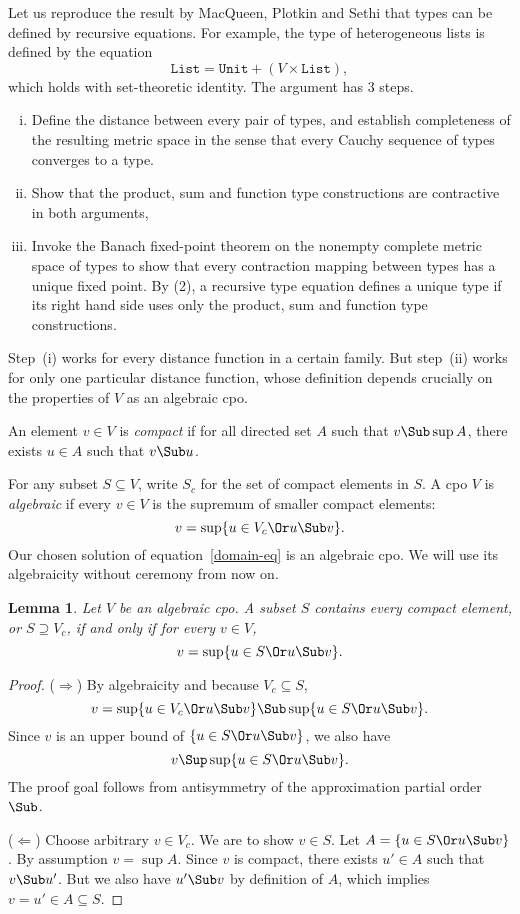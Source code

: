\documentclass{amsart}
\newtheorem{lemma}[subsection]{Lemma}
\begin{document}

Let us reproduce the result by MacQueen, Plotkin and Sethi that
types can be defined by recursive equations. For example, the
type of heterogeneous lists is defined by the equation
\[
\texttt{List} = \texttt{Unit} + (V \times \texttt{List}),
\]
which holds with set-theoretic identity. The argument has 3
steps.
\begin{enumerate}[(i)]
\item Define the distance between every pair of types, and
establish completeness of the resulting metric space in the sense
that every Cauchy sequence of types converges to a type.
\item Show that the product, sum and function type constructions
are contractive in both arguments,
\item Invoke the Banach fixed-point theorem on the nonempty
complete metric space of types to show that every contraction
mapping between types has a unique fixed point. By (2), a
recursive type equation defines a unique type if its right hand
side uses only the product, sum and function type constructions.
\end{enumerate}

Step~(i) works for every distance function in a certain family.
But step~(ii) works for only one particular distance function,
whose definition depends crucially on the properties of $V$ as an
algebraic cpo.


An element $v\in V$ is \emph{compact} if for all directed set $A$
such that $v\Sub\sup A$, there exists $u\in A$ such that $v\Sub
u$.

For any subset $S\subseteq V$, write $S_c$ for the set of compact
elements in $S$. A cpo $V$ is \emph{algebraic} if every $v\in V$
is the supremum of smaller compact elements:
\[
v=\sup \{u \in V_c \Or u \Sub v \}.
\]
Our chosen solution of equation~\eqref{domain-eq} is an algebraic
cpo. We will use its algebraicity without ceremony from now on.

\begin{lemma}
Let $V$ be an algebraic cpo. A subset $S$ contains every compact
element, or $S\supseteq V_c$, if and only if for every $v\in V$,
\[
v=\sup\{u\in S \Or u\Sub v\}.
\]
\end{lemma}

\begin{proof}
($\Rightarrow$) By algebraicity and because $V_c\subseteq S$,
\[
v=\sup\{u\in V_c \Or u \Sub v\} \Sub \sup\{u\in S \Or u \Sub v\}.
\]
Since $v$ is an upper bound of $\{u\in S \Or u \Sub v\}$, we also
have
\[
v\Sup \sup\{u\in S \Or u \Sub v\}.
\]
The proof goal follows from antisymmetry of the approximation
partial order $\Sub$.

($\Leftarrow$) Choose arbitrary $v\in V_c$. We are to show $v\in
S$. Let $A= \{u \in S \Or u \Sub v\}$. By assumption $v=\sup A$.
Since $v$ is compact, there exists $u'\in A$ such that $v\Sub
u'$. But we also have $u'\Sub v$ by definition of $A$, which
implies $v=u'\in A\subseteq S$.
\end{proof}
\end{document}
